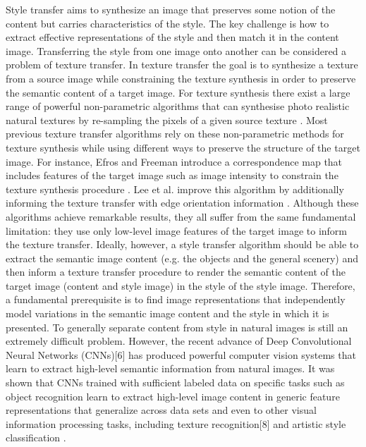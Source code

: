\hspace{1cm} Style transfer aims to synthesize an image that
preserves some notion of the content but carries characteristics of the style. The key challenge is how to extract effective representations of the style and then match it in the content image.
Transferring the style from one image onto another can be considered a problem of texture transfer. In texture transfer the goal is to synthesize a texture from a source image while constraining the texture synthesis in order to preserve the semantic content of a target image. For texture synthesis there exist a large range of powerful non-parametric algorithms that can synthesise photo realistic natural textures by re-sampling the pixels of a given source texture \cite{bib1, bib2, bib3, bib4}. Most previous texture transfer algorithms rely on these non-parametric methods for texture synthesis while using different ways to preserve the structure of the target image. For instance, Efros and Freeman introduce a correspondence map that includes features of the target image such as image intensity to constrain the texture synthesis procedure \cite{bib3}. Lee et al. improve this algorithm by additionally informing the texture transfer with edge orientation information \cite{bib3}. Although these algorithms achieve remarkable results, they all suffer from the same fundamental limitation: they use only low-level image features of the target image to inform the texture transfer. Ideally, however, a style transfer algorithm should be able to extract the semantic image content (e.g. the objects and the general scenery) and then inform a texture transfer procedure to render the semantic content of the target image (content and style image) in the style of the style image. Therefore, a fundamental prerequisite is to find image representations that independently model variations in the semantic image content and the style in which it is presented.
To generally separate content from style in natural images is still an extremely difficult problem.\newline
However, the recent advance of Deep Convolutional Neural Networks (CNNs)[6] has produced powerful computer vision systems that learn to extract high-level semantic information from natural images.  It was shown that CNNs trained with sufficient labeled data on specific tasks such as object recognition learn to extract high-level image content in generic feature representations that generalize across data sets \cite{bib3} and even to other visual information processing tasks, including texture recognition[8] and artistic style classification \cite{bib15}.\newline
